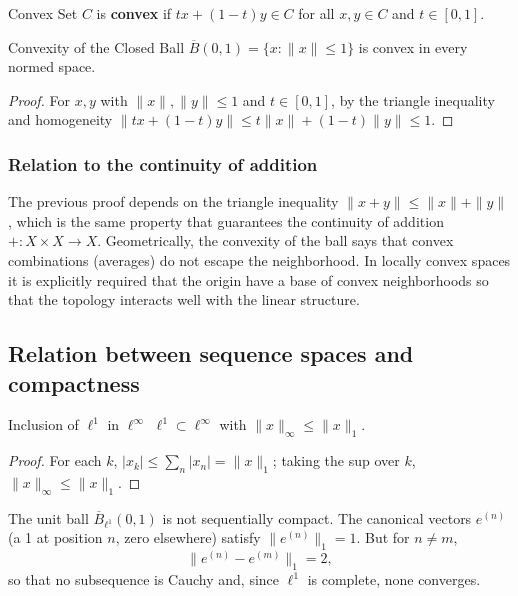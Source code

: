\documentclass[11pt, a4paper]{article}
\begin{document}
\begin{definicion}{Convex Set}{}
$C$ is \textbf{convex} if $tx + (1-t)y \in C$ for all $x, y \in C$ and $t \in [0,1]$.
\end{definicion}

\begin{proposicion}{Convexity of the Closed Ball}{}
$\overline{B}(0,1) = \{x : \|x\| \le 1\}$ is convex in every normed space.
\end{proposicion}

\begin{proof}
For $x, y$ with $\|x\|, \|y\| \le 1$ and $t \in [0,1]$, by the triangle inequality and homogeneity
$\|tx + (1-t)y\| \le t\|x\| + (1-t)\|y\| \le 1$.
\end{proof}

\subsubsection{Relation to the continuity of addition}
The previous proof depends on the triangle inequality $\|x+y\| \le \|x\| + \|y\|$, which is the same property
that guarantees the continuity of addition $+: X \times X \to X$. Geometrically, the convexity of
the ball says that convex combinations (averages) do not escape the neighborhood. In locally
convex spaces it is explicitly required that the origin have a base of convex neighborhoods so that
the topology interacts well with the linear structure.

\subsection{Relation between sequence spaces and compactness}

\begin{proposicion}{Inclusion of $\ell^1$ in $\ell^\infty$}{}
$\ell^1 \subset \ell^\infty$ with $\|x\|_\infty \le \|x\|_1$.
\end{proposicion}

\begin{proof}
For each $k$, $|x_k| \le \sum_n |x_n| = \|x\|_1$; taking the sup over $k$, $\|x\|_\infty \le \|x\|_1$.
\end{proof}

\begin{ejemplo}{}{}
The unit ball $\overline{B}_{\ell^1}(0,1)$ is not sequentially compact. The canonical vectors
$e^{(n)}$ (a 1 at position $n$, zero elsewhere) satisfy $\|e^{(n)}\|_1 = 1$. But for
$n \ne m$,
$$ \|e^{(n)} - e^{(m)}\|_1 = 2, $$
so that no subsequence is Cauchy and, since $\ell^1$ is complete, none converges.
\end{ejemplo}
\end{document}
